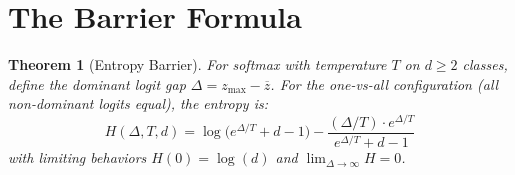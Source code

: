 \documentclass[11pt,a4paper]{amsart}
\theoremstyle{plain}
\newtheorem{theorem}{Theorem}[section]
\theoremstyle{definition}
\begin{document}
\section{The Barrier Formula}

\begin{theorem}[Entropy Barrier]\label{thm:barrier}
For softmax with temperature $T$ on $d \geq 2$ classes, define the
dominant logit gap $\Delta = z_{\max} - \overline{z}$. For the
one-vs-all configuration (all non-dominant logits equal), the
entropy is:
\begin{equation}\label{eq:barrier}
H(\Delta, T, d) = \log\bigl(e^{\Delta/T} + d - 1\bigr) - \frac{(\Delta/T) \cdot e^{\Delta/T}}{e^{\Delta/T} + d - 1}
\end{equation}
with limiting behaviors $H(0) = \log(d)$ and $\lim_{\Delta\to\infty} H = 0$.
\end{theorem}
\end{document}
